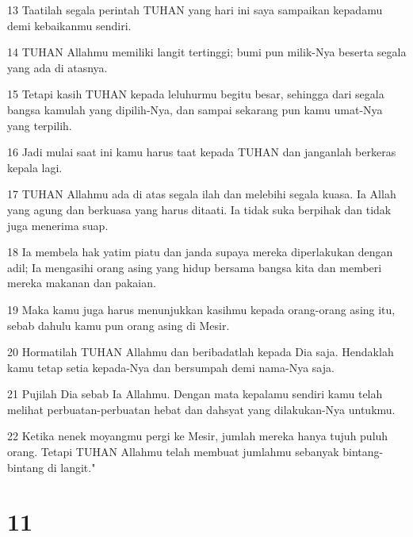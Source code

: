 \par 13 Taatilah segala perintah TUHAN yang hari ini saya sampaikan kepadamu demi kebaikanmu sendiri.
\par 14 TUHAN Allahmu memiliki langit tertinggi; bumi pun milik-Nya beserta segala yang ada di atasnya.
\par 15 Tetapi kasih TUHAN kepada leluhurmu begitu besar, sehingga dari segala bangsa kamulah yang dipilih-Nya, dan sampai sekarang pun kamu umat-Nya yang terpilih.
\par 16 Jadi mulai saat ini kamu harus taat kepada TUHAN dan janganlah berkeras kepala lagi.
\par 17 TUHAN Allahmu ada di atas segala ilah dan melebihi segala kuasa. Ia Allah yang agung dan berkuasa yang harus ditaati. Ia tidak suka berpihak dan tidak juga menerima suap.
\par 18 Ia membela hak yatim piatu dan janda supaya mereka diperlakukan dengan adil; Ia mengasihi orang asing yang hidup bersama bangsa kita dan memberi mereka makanan dan pakaian.
\par 19 Maka kamu juga harus menunjukkan kasihmu kepada orang-orang asing itu, sebab dahulu kamu pun orang asing di Mesir.
\par 20 Hormatilah TUHAN Allahmu dan beribadatlah kepada Dia saja. Hendaklah kamu tetap setia kepada-Nya dan bersumpah demi nama-Nya saja.
\par 21 Pujilah Dia sebab Ia Allahmu. Dengan mata kepalamu sendiri kamu telah melihat perbuatan-perbuatan hebat dan dahsyat yang dilakukan-Nya untukmu.
\par 22 Ketika nenek moyangmu pergi ke Mesir, jumlah mereka hanya tujuh puluh orang. Tetapi TUHAN Allahmu telah membuat jumlahmu sebanyak bintang-bintang di langit."

\chapter{11}

